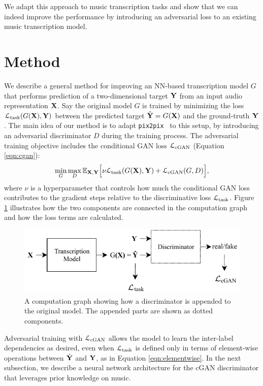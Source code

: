 We adapt this approach to music transcription tasks and show that we can indeed improve the performance by introducing an adversarial loss to an existing music transcription model.



\section{Method}

We describe a general method for improving an NN-based transcription model $G$ that performs prediction of a two-dimensional target $\mathbf{Y}$ from an input audio representation $\mathbf{X}$.
Say the original model $G$ is trained by minimizing the loss $\mathcal{L}_{\textrm{task}}(G(\mathbf{X}), \mathbf{Y})$ between the predicted target $\hat{\mathbf{Y}} = G(\mathbf{X})$ and the ground-truth $\mathbf{Y}$. 
The main idea of our method is to adapt \texttt{pix2pix}~\cite{isola2017pix2pix} to this setup, by introducing an adversarial discriminator $D$ during the training process.
The adversarial training objective includes the conditional GAN loss $\mathcal{L}_{\text{cGAN}}$ (Equation \ref{eqn:cgan}):
\begin{equation}
\min_{G}\max_{D} \mathbb{E}_{\mathbf{X},\mathbf{Y}} \Big [ \nu\mathcal{L}_{\text{task}} (G(\mathbf{X}), \mathbf{Y}) + \mathcal{L}_{\text{cGAN}}(G, D) \Big ],
\end{equation}
where $\nu$ is a hyperparameter that controls how much the conditional GAN loss contributes to the gradient steps relative to the discriminative loss $\mathcal{L}_{\text{task}}$.
Figure \ref{fig:discriminator} illustrates how the two components are connected in the computation graph and how the loss terms are calculated.

\begin{figure}[t]
	\centering\includegraphics[width=0.8\columnwidth]{discriminator.pdf}
	\caption{A computation graph showing how a discriminator is appended to the original model. The appended parts are shown as dotted components.}\label{fig:discriminator}
\end{figure}

Adversarial training with $\mathcal{L}_{\text{cGAN}}$ allows the model to learn the inter-label dependencies as desired, even when $\mathcal{L}_{\text{task}}$ is defined only in terms of element-wise operations between $\hat{\mathbf{Y}}$ and $\mathbf{Y}$, as in Equation \ref{eqn:elementwise}.
In the next subsection, we describe a neural network architecture for the  cGAN discriminator that leverages prior knowledge on music.


